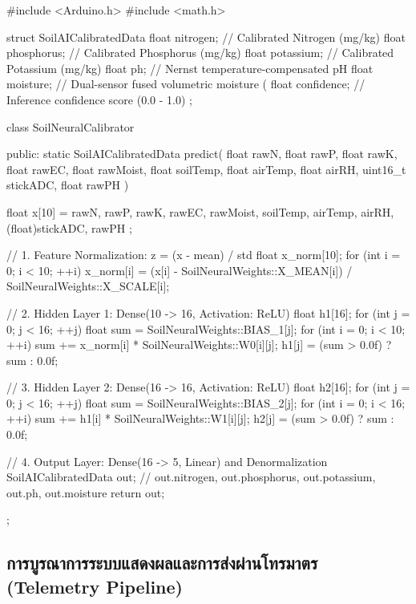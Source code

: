 \begin{cppbox}
#include <Arduino.h>
#include <math.h>

struct SoilAICalibratedData {
    float nitrogen;     // Calibrated Nitrogen (mg/kg)
    float phosphorus;   // Calibrated Phosphorus (mg/kg)
    float potassium;    // Calibrated Potassium (mg/kg)
    float ph;           // Nernst temperature-compensated pH
    float moisture;     // Dual-sensor fused volumetric moisture (%
    float confidence;   // Inference confidence score (0.0 - 1.0)
};

class SoilNeuralCalibrator {
public:
    static SoilAICalibratedData predict(
        float rawN, float rawP, float rawK, float rawEC, float rawMoist,
        float soilTemp, float airTemp, float airRH, uint16_t stickADC, float rawPH
    ) {
        float x[10] = { rawN, rawP, rawK, rawEC, rawMoist, soilTemp, airTemp, airRH, (float)stickADC, rawPH };
        
        // 1. Feature Normalization: z = (x - mean) / std
        float x_norm[10];
        for (int i = 0; i < 10; ++i) {
            x_norm[i] = (x[i] - SoilNeuralWeights::X_MEAN[i]) / SoilNeuralWeights::X_SCALE[i];
        }

        // 2. Hidden Layer 1: Dense(10 -> 16, Activation: ReLU)
        float h1[16];
        for (int j = 0; j < 16; ++j) {
            float sum = SoilNeuralWeights::BIAS_1[j];
            for (int i = 0; i < 10; ++i) sum += x_norm[i] * SoilNeuralWeights::W0[i][j];
            h1[j] = (sum > 0.0f) ? sum : 0.0f;
        }

        // 3. Hidden Layer 2: Dense(16 -> 16, Activation: ReLU)
        float h2[16];
        for (int j = 0; j < 16; ++j) {
            float sum = SoilNeuralWeights::BIAS_2[j];
            for (int i = 0; i < 16; ++i) sum += h1[i] * SoilNeuralWeights::W1[i][j];
            h2[j] = (sum > 0.0f) ? sum : 0.0f;
        }

        // 4. Output Layer: Dense(16 -> 5, Linear) and Denormalization
        SoilAICalibratedData out;
        // out.nitrogen, out.phosphorus, out.potassium, out.ph, out.moisture
        return out;
    }
};
\end{cppbox}

\subsection{การบูรณาการระบบแสดงผลและการส่งผ่านโทรมาตร (Telemetry Pipeline)}

